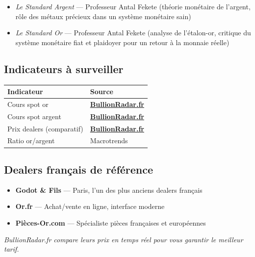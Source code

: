 \documentclass[14pt,a4paper]{extarticle}
\begin{document}
\begin{itemize}
  \item \textit{Le Standard Argent} --- Professeur Antal Fekete (théorie monétaire de l'argent, rôle des métaux précieux dans un système monétaire sain)
  \item \textit{Le Standard Or} --- Professeur Antal Fekete (analyse de l'étalon-or, critique du système monétaire fiat et plaidoyer pour un retour à la monnaie réelle)
\end{itemize}

\subsection*{Indicateurs à surveiller}

\begin{center}
\begin{tabular}{ll}
\toprule
Indicateur & Source \\
\midrule
Cours spot or & \href{https://bullionradar.fr/cours-or}{\textbf{BullionRadar.fr}} \\
Cours spot argent & \href{https://bullionradar.fr/cours-argent}{\textbf{BullionRadar.fr}} \\
Prix dealers (comparatif) & \href{https://bullionradar.fr}{\textbf{BullionRadar.fr}} \\
Ratio or/argent & Macrotrends \\
\bottomrule
\end{tabular}
\end{center}

\subsection*{Dealers français de référence}

\begin{itemize}
  \item \textbf{Godot \& Fils} --- Paris, l'un des plus anciens dealers français
  \item \textbf{Or.fr} --- Achat/vente en ligne, interface moderne
  \item \textbf{Pièces-Or.com} --- Spécialiste pièces françaises et européennes
\end{itemize}

\textit{BullionRadar.fr compare leurs prix en temps réel pour vous garantir le meilleur tarif.}

\newpage

\end{document}
